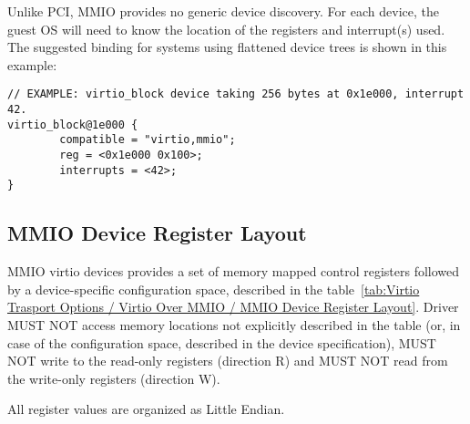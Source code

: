 Unlike PCI, MMIO provides no generic device discovery.  For each
device, the guest OS will need to know the location of the registers
and interrupt(s) used.  The suggested binding for systems using
flattened device trees is shown in this example:

\begin{lstlisting}
// EXAMPLE: virtio_block device taking 256 bytes at 0x1e000, interrupt 42.
virtio_block@1e000 {
        compatible = "virtio,mmio";
        reg = <0x1e000 0x100>;
        interrupts = <42>;
}
\end{lstlisting}

\subsection{MMIO Device Register Layout}\label{sec:Virtio Transport Options / Virtio Over MMIO / MMIO Device Register Layout}

MMIO virtio devices provides a set of memory mapped control
registers followed by a device-specific configuration space,
described in the table~\ref{tab:Virtio Trasport Options / Virtio Over MMIO / MMIO Device Register Layout}.
Driver MUST NOT access memory locations not explicitly described in the
table (or, in case of the configuration space, described in the device specification),
MUST NOT write to the read-only registers (direction R) and
MUST NOT read from the write-only registers (direction W).

All register values are organized as Little Endian.


\newcommand{\mmioreg}[5]{%
  {\field{#1}} \newline #3 \newline #4 & {\bf#2} \newline #5 \\
}

\newcommand{\mmiodreg}[7]{%
  {\bf#1} \newline #4 \newline {\bf#2} \newline #5 \newline #6 & {\bf#3} \newline #7 \\
}

